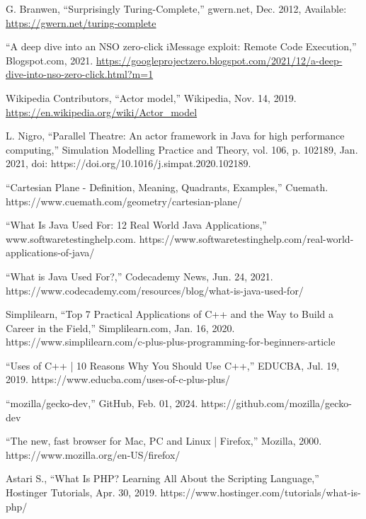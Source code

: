 \documentclass[12pt]{report} %
\begin{document}
\begin{singlespace}
\begin{thebibliography}{}
             G. Branwen, “Surprisingly Turing-Complete,” gwern.net, Dec. 2012, Available: \href{https://gwern.net/turing-complete}{https://gwern.net/turing-complete}

             “A deep dive into an NSO zero-click iMessage exploit: Remote Code Execution,” Blogspot.com, 2021. \href{https://googleprojectzero.blogspot.com/2021/12/a-deep-dive-into-nso-zero-click.html?m=1}{https://googleprojectzero.blogspot.com/2021/12/a-deep-dive-into-nso-zero-click.html?m=1}

             Wikipedia Contributors, “Actor model,” Wikipedia, Nov. 14, 2019. \href{https://en.wikipedia.org/wiki/Actor_model}{https://en.wikipedia.org/wiki/Actor\_model}
           
             L. Nigro, “Parallel Theatre: An actor framework in Java for high performance computing,” Simulation Modelling Practice and Theory, vol. 106, p. 102189, Jan. 2021, doi: https://doi.org/10.1016/j.simpat.2020.102189. 

             “Cartesian Plane - Definition, Meaning, Quadrants, Examples,” Cuemath. https://www.cuemath.com/geometry/cartesian-plane/

             “What Is Java Used For: 12 Real World Java Applications,” www.softwaretestinghelp.com. https://www.softwaretestinghelp.com/real-world-applications-of-java/

             “What is Java Used For?,” Codecademy News, Jun. 24, 2021. https://www.codecademy.com/resources/blog/what-is-java-used-for/

             Simplilearn, “Top 7 Practical Applications of C++ and the Way to Build a Career in the Field,” Simplilearn.com, Jan. 16, 2020. https://www.simplilearn.com/c-plus-plus-programming-for-beginners-article

             “Uses of C++ | 10 Reasons Why You Should Use C++,” EDUCBA, Jul. 19, 2019. https://www.educba.com/uses-of-c-plus-plus/

             “mozilla/gecko-dev,” GitHub, Feb. 01, 2024. https://github.com/mozilla/gecko-dev

             “The new, fast browser for Mac, PC and Linux | Firefox,” Mozilla, 2000. https://www.mozilla.org/en-US/firefox/
        
             Astari S., “What Is PHP? Learning All About the Scripting Language,” Hostinger Tutorials, Apr. 30, 2019. https://www.hostinger.com/tutorials/what-is-php/


\end{thebibliography}
\end{singlespace}
\end{document}
